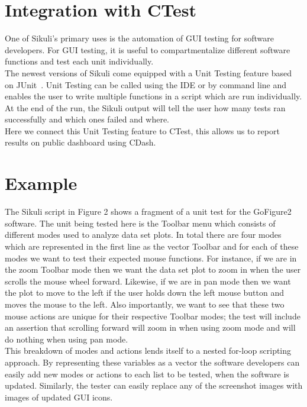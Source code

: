 \documentclass{InsightArticle}
\begin{document}
\section{Integration with CTest}

One of Sikuli's primary uses is the automation of GUI testing for software
developers. For GUI testing, it is useful to compartmentalize different software
functions and test each unit individually.\\

The newest versions of Sikuli come equipped with a Unit Testing feature based
on JUnit~\cite{}. Unit Testing can be called using the IDE or by command
line and enables the user to write multiple functions in a script which are
run individually. At the end of the run, the Sikuli output will tell the user
how many tests ran successfully and which ones failed and where.\\

Here we connect this Unit Testing feature to CTest, this allows us to report
results on public dashboard using CDash.


\section{Example}

The Sikuli script in Figure 2 shows a fragment of a unit test for the GoFigure2 software.  The unit being tested here
is the Toolbar menu which consists of different modes used to analyze data set plots.
In total there are four modes which are represented in the first line as the vector Toolbar and for each
of these modes we want to test their expected mouse functions.  For instance, if we are in the zoom Toolbar mode
then we want the data set plot to zoom in when the user scrolls the mouse wheel forward.  Likewise,
if we are in pan mode then we want the plot to move to the left if the user holds down the left mouse button and moves
the mouse to the left.  Also importantly, we want to see that these two mouse actions are unique for their respective Toolbar modes;
the test will include an assertion that scrolling forward will zoom in when using zoom mode and will do nothing when using pan mode.\\

This breakdown of modes and actions lends itself to a nested for-loop scripting approach. By representing
these variables as a vector the software developers can easily add new modes or actions to each list to be tested, when
the software is updated. Similarly, the tester can easily replace any of the screenshot images with images of updated
GUI icons.\\  
\end{document}
